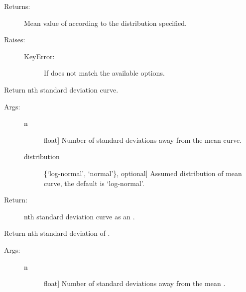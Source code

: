 \documentclass[letterpaper,10pt,english,openany,oneside]{sphinxmanual}
\begin{document}
\begin{fulllineitems}
\begin{fulllineitems}
\begin{description}
\begin{description}
\end{description}

\item[{Returns:}] \leavevmode
Mean value of  according to the distribution specified.

\item[{Raises:}] \leavevmode\begin{description}
\item[{KeyError:}] \leavevmode
If  does not match the available options.

\end{description}

\end{description}

\end{fulllineitems}


\begin{fulllineitems}
\label{\detokenize{index:hvsrpy.Hvsr.nstd_curve}}
Return nth standard deviation curve.
\begin{description}
\item[{Args:}] \leavevmode\begin{description}
\item[{n}] \leavevmode{[}float{]}
Number of standard deviations away from the mean curve.

\item[{distribution}] \leavevmode{[}\{‘log-normal’, ‘normal’\}, optional{]}
Assumed distribution of mean curve, the default is
‘log-normal’.

\end{description}

\item[{Return:}] \leavevmode
nth standard deviation curve as an .

\end{description}

\end{fulllineitems}


\begin{fulllineitems}
\label{\detokenize{index:hvsrpy.Hvsr.nstd_f0}}
Return nth standard deviation of .
\begin{description}
\item[{Args:}] \leavevmode\begin{description}
\item[{n}] \leavevmode{[}float{]}
Number of standard deviations away from the mean .


\end{description}
\end{description}
\end{fulllineitems}
\end{fulllineitems}
\end{document}
